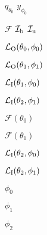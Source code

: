 $q_{\theta_0}$
$y_{\phi_0}$

$\mathcal{F}$
$\mathcal{I}_{\rm b}$
$\mathcal{I}_{\rm u}$

$\mathcal{L}_{\rm O}(\theta_0,\phi_0)$

$\mathcal{L}_{\rm O}(\theta_1,\phi_1)$

$\mathcal{L}_{\rm I}(\theta_1,\phi_0)$

$\mathcal{L}_{\rm I}(\theta_2,\phi_1)$

$\mathcal{F}(\theta_0)$

$\mathcal{F}(\theta_1)$

$\mathcal{L}_{\rm I}(\theta_2,\phi_0)$

$\mathcal{L}_{\rm I}(\theta_2,\phi_1)$


$\phi_0$

$\phi_1$

$\phi_2$
